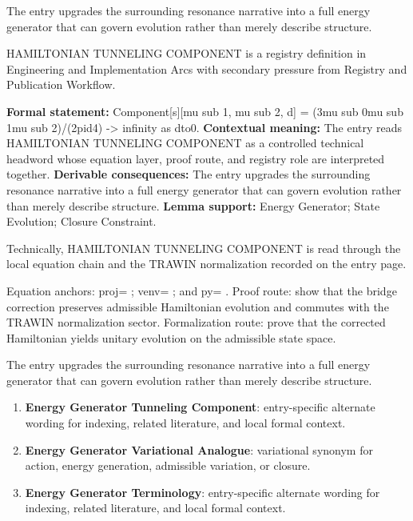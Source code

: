 The entry upgrades the surrounding resonance narrative into a full energy generator that can govern evolution rather than merely describe structure.
\clearpage


\begingroup\small
{}
HAMILTONIAN TUNNELING COMPONENT is a registry definition in Engineering and Implementation Arcs with secondary pressure from Registry and Publication Workflow.

\begingroup\footnotesize\setlength{\emergencystretch}{3em}\sloppy
\textbf{Formal statement:} Component[s][mu sub 1, mu sub 2, d] = (3mu sub 0mu sub 1mu sub 2)/(2pid4) -> infinity as dto0. \textbf{Contextual meaning:} The entry reads HAMILTONIAN TUNNELING COMPONENT as a controlled technical headword whose equation layer, proof route, and registry role are interpreted together. \textbf{Derivable consequences:} The entry upgrades the surrounding resonance narrative into a full energy generator that can govern evolution rather than merely describe structure. \textbf{Lemma support:} Energy Generator; State Evolution; Closure Constraint.\par
\endgroup

Technically, HAMILTONIAN TUNNELING COMPONENT is read through the local equation chain and the TRAWIN normalization recorded on the entry page.

Equation anchors: proj= ; venv= ; and py= . Proof route: show that the bridge correction preserves admissible Hamiltonian evolution and commutes with the TRAWIN normalization sector. Formalization route: prove that the corrected Hamiltonian yields unitary evolution on the admissible state space.

The entry upgrades the surrounding resonance narrative into a full energy generator that can govern evolution rather than merely describe structure.
\endgroup

\begin{enumerate}[leftmargin=1.6em,itemsep=6pt,topsep=4pt]
\item \textbf{Energy Generator Tunneling Component}: entry-specific alternate wording for indexing, related literature, and local formal context.
\item \textbf{Energy Generator Variational Analogue}: variational synonym for action, energy generation, admissible variation, or closure.
\item \textbf{Energy Generator Terminology}: entry-specific alternate wording for indexing, related literature, and local formal context.
\end{enumerate}

